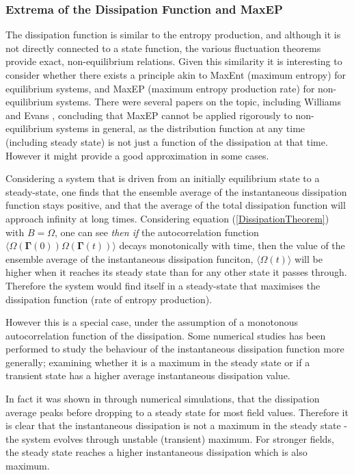 \documentclass[a4paper,12pt]{article}
\begin{document}

\subsubsection{Extrema of the Dissipation Function and MaxEP}
The dissipation function is similar to the entropy production, and although it is not directly connected to a state function, the various fluctuation theorems provide exact, non-equilibrium relations. Given this similarity it is interesting to consider whether there exists a principle akin to MaxEnt (maximum entropy) for equilibrium systems, and MaxEP (maximum entropy production rate) for non-equilibrium systems. There were several papers on the topic, including Williams and Evans \cite{Williams:2008ft}, concluding that MaxEP cannot be applied rigorously to non-equilibrium systems in general, as the distribution function at any time (including steady state) is not just a function of the dissipation at that time. However it might provide a good approximation in some cases.

Considering a system that is driven from an initially equilibrium state to a steady-state, one finds that the ensemble average of the instantaneous dissipation function stays positive, and that the average of the total dissipation function will approach infinity at long times. Considering equation (\ref{DissipationTheorem}) with $B=\Omega$, one can see \textit{then if} the autocorrelation function $\langle \Omega(\bm{\Gamma}(0))\Omega(\bm{\Gamma}(t))\rangle$ decays monotonically with time, then the value of the ensemble average of the instantaneous dissipation funciton, $\langle \Omega(t) \rangle$ will be higher when it reaches its steady state than for any other state it passes through. Therefore the system would find itself in a steady-state that maximises the dissipation function (rate of entropy production).

However this is a special case, under the assumption of a monotonous autocorrelation function of the dissipation. Some numerical studies has been performed to study the behaviour of the instantaneous dissipation function more generally; examining whether it is a maximum in the steady state or if a transient state has a higher average instantaneous dissipation value.

In fact it was shown in \cite{Brookes:2011hu} through numerical simulations, that the dissipation average peaks before dropping to a steady state for most field values. Therefore it is clear that the instantaneous dissipation is not a maximum in the steady state - the system evolves through unstable (transient) maximum. For stronger fields, the steady state reaches a higher instantaneous dissipation which is also maximum.
\end{document}
